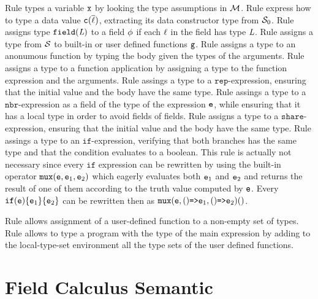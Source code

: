 Rule  types a variable $\mathtt{x}$ by looking the type assumptions in $\mathcal{M}$. Rule  express how to type a data value $\mathtt{c}(\overline{\ell})$, extracting its data constructor type from $\mathcal{S}_0$. Rule  assigns type $\mathtt{field}(\textit{L})$ to a field $\phi$ if each $\ell$ in the field has type $\textit{L}$. Rule  assigns a type from $\mathcal{S}$ to built-in or user defined functions $\mathtt{g}$. Rule  assigns a type to an anonumous function by typing the body given the types of the arguments. Rule  assigns a type to a function application by assigning a type to the function expression and the arguments. Rule  assings a type to a $\mathtt{rep}$-expression, ensuring that the initial value and the body have the same type. Rule  assings a type to a $\mathtt{nbr}$-expression as a field of the type of the expression $\mathtt{e}$, while ensuring that it has a local type in order to avoid fields of fields. Rule  assigns a type to a $\mathtt{share}$-expression, ensuring that the initial value and the body have the same type. Rule  assings a type to an $\mathtt{if}$-expression, verifying that both branches has the same type and that the condition evaluates to a boolean. This rule is actually not necessary since every $\mathtt{if}$ expression can be rewritten by using the built-in operator $\mathtt{mux}(\mathtt{e},\mathtt{e}_1,\mathtt{e}_2)$ which eagerly evaluates both $\mathtt{e}_1$ and $\mathtt{e}_2$ and returns the result of one of them according to the truth value computed by $\mathtt{e}$. Every $\mathtt{if}(\mathtt{e})\{\mathtt{e}_1\}\{\mathtt{e}_2\}$ can be rewritten then as $\mathtt{mux}(\mathtt{e},()\mathrm{ \texttt{=>}\mathtt{e} }_1,()\mathrm{ \texttt{=>}\mathtt{e} }_2)()$.

Rule  allows assignment of a user-defined function to a non-empty set of types. Rule  allows to type a program with the type of the main expression by adding to the local-type-set environment all the type sets of the user defined functions.


\section{Field Calculus Semantic}

